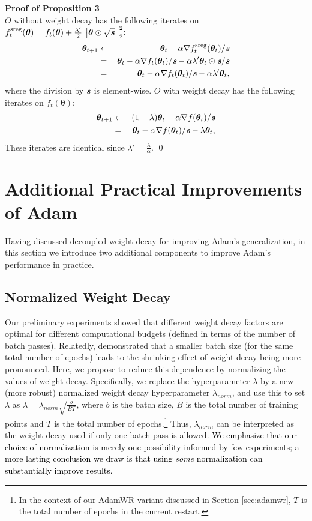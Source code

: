 \documentclass[usenames,dvipsnames]{article}
\newcommand{\norm}[1]{\left\lVert#1\right\rVert}
\newcommand{\franknips}[1]{\textcolor{black}{#1}}
\newcommand{\vc}[1]{\textit{\textbf{#1}}}
\begin{document}
\noindent{}\textbf{Proof of Proposition 3}\\
$O$ without weight decay has the following iterates on $f_{t}^{\text{sreg}}(\bm{\theta}) = f_t(\bm{\theta}) + \frac{\lambda'}{2} \norm{\bm{\theta} \odot{} \sqrt{\vc{s}}}_2^2$: 
\begin{eqnarray}
\label{eq:sgdl2}
\bm{\theta}_{t+1} & \leftarrow &\bm{\theta}_t - \alpha \nabla f_{t}^{\text{sreg}}(\bm{\theta}_t)/\vc{s}\\
&=& \bm{\theta}_t - \alpha \nabla f_t(\bm{\theta}_t)/\vc{s} - \alpha  \lambda' \bm{\theta}_t \odot \vc{s} / \vc{s}\\
&=& \bm{\theta}_t - \alpha \nabla f_t(\bm{\theta}_t)/\vc{s} - \alpha  \lambda' \bm{\theta}_t,
\end{eqnarray}
where the division by $\vc{s}$ is element-wise.
$O$ with weight decay has the following iterates on $f_t(\bm{\theta})$: 
\begin{eqnarray}
\bm{\theta}_{t+1} &\leftarrow& (1 - \lambda) \bm{\theta}_t - \alpha \nabla f(\bm{\theta}_t) / \vc{s}\\
&=& \bm{\theta}_t - \alpha \nabla f(\bm{\theta}_t) / \vc{s} -\lambda \bm{\theta}_t ,
\end{eqnarray}
These iterates are identical since $\lambda' = \frac{\lambda}{\alpha}$. \qed

\section{Additional Practical Improvements of Adam}\label{sec:practical_improvements}
Having discussed decoupled weight decay for improving Adam's generalization, in this section we introduce two additional components to improve Adam's performance in practice.

\subsection{Normalized Weight Decay}
\label{sec:normw}
Our preliminary experiments showed that different weight decay factors are optimal for different computational budgets (defined in terms of the number of batch passes).
Relatedly, \citet{li2017visualizing} demonstrated that a smaller batch size (for the same total number of epochs) leads to the shrinking effect of weight decay being more pronounced.
Here, we propose to reduce this dependence by normalizing the values of weight decay. Specifically, we replace the hyperparameter $\lambda$ by a new (more robust) normalized weight decay hyperparameter $\lambda_{norm}$, and use this to set $\lambda$ 
as $\lambda = \lambda_{norm} \sqrt{ \frac{b}{B T} }$,	 
where $b$ is the batch size, $B$ is the total number of training points and $T$ is the total number of epochs.\footnote{In the context of our AdamWR variant discussed in Section \ref{sec:adamwr}, $T$ is the total number of epochs in the current restart.}
Thus, $\lambda_{norm}$ can be interpreted as the weight decay used if only one batch pass is allowed.
\franknips{We emphasize that our choice of normalization is merely one possibility informed by few experiments; a more lasting conclusion we draw is that using \emph{some} normalization can substantially improve results.}
\end{document}
